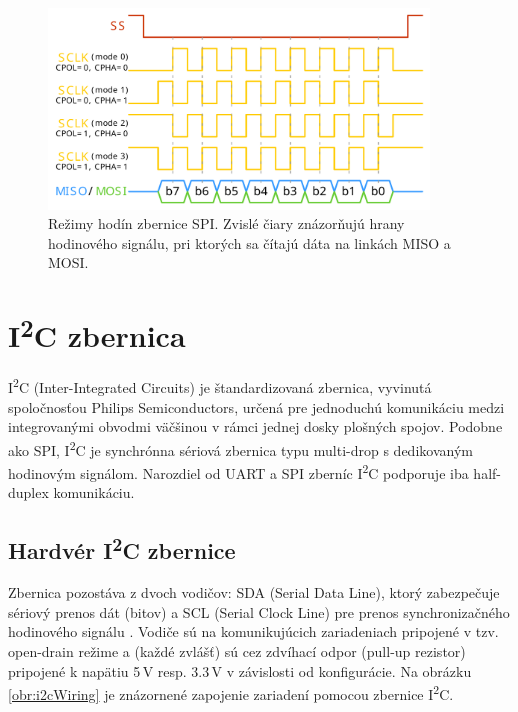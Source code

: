 \begin{figure}
    \centerline{\includegraphics[width=0.9\textwidth]{images/spiSignals.pdf}}
    \caption[Režimy hodín zbernice SPI]{Režimy hodín zbernice SPI. Zvislé čiary znázorňujú hrany hodinového signálu, pri ktorých sa čítajú dáta na linkách MISO a MOSI.}
    \label{obr:spiModes}
\end{figure}

\section{I\textsuperscript{2}C zbernica}
I\textsuperscript{2}C (Inter-Integrated Circuits) je štandardizovaná zbernica, vyvinutá spoločnosťou Philips Semiconductors, určená pre jednoduchú komunikáciu medzi integrovanými obvodmi \cite{i2cSpec} väčšinou v rámci jednej dosky plošných spojov. Podobne ako SPI, I\textsuperscript{2}C je synchrónna sériová zbernica typu multi-drop s dedikovaným hodinovým signálom. Narozdiel od UART a SPI zberníc I\textsuperscript{2}C podporuje iba half-duplex komunikáciu.

\subsection{Hardvér I\textsuperscript{2}C zbernice}
Zbernica pozostáva z dvoch vodičov: SDA (Serial Data Line), ktorý zabezpečuje sériový prenos dát (bitov) a SCL (Serial Clock Line) pre prenos synchronizačného hodinového signálu \cite{i2cSpec}. Vodiče sú na komunikujúcich zariadeniach pripojené v tzv. open-drain režime a (každé zvlášť) sú cez zdvíhací odpor (pull-up rezistor) pripojené k napätiu 5\,V resp. 3.3\,V v závislosti od konfigurácie. Na obrázku \ref{obr:i2cWiring} je znázornené zapojenie zariadení pomocou zbernice I\textsuperscript{2}C.

